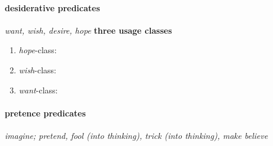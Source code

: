 \documentclass[a4,12pt]{scrartcl}
\begin{document}
\paragraph {\bf desiderative predicates} \cite[3.2.7]{noonan2007} {\it want, wish, desire, hope}
{\bf three usage classes}
	\begin{enumerate}
		\item {\it hope}-class: %
		
\begin{exe}

\ex %

\end{exe}
		\item {\it wish}-class: %
		
\begin{exe}


\ex %

\end{exe}
		\item {\it want}-class: %
		
\begin{exe}

\ex %

\ex %

\end{exe}
	\end{enumerate}


\paragraph {\bf pretence predicates} \cite[3.2.3]{noonan2007} %
{\it imagine; pretend, fool (into thinking), trick (into thinking), make believe}
\end{document}
